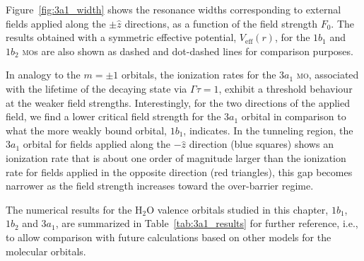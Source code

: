 Figure~\ref{fig:3a1_width} shows the resonance widths corresponding to
external fields applied along the $\pm\hat{z}$ directions, as a
function of the field strength $F_{0}$. The results obtained with a
symmetric effective potential, $V_{\mathrm{eff}}(r)$, for the $1b_{1}$
and $1b_{2}$ \textsc{mo}s are also shown as dashed and dot-dashed
lines for comparison purposes.

In analogy to the $m=\pm 1$ orbitals, the ionization rates for the
$3a_{1}$ \textsc{mo}, associated with the lifetime of the decaying
state via $\Gamma\tau=1$, exhibit a threshold behaviour at the weaker
field strengths. Interestingly, for the two directions of the applied
field, we find a lower critical field strength for the $3a_{1}$
orbital in comparison to what the more weakly bound orbital, $1b_{1}$,
indicates.  In the tunneling region, the $3a_{1}$ orbital for fields
applied along the $-\hat{z}$ direction (blue squares) shows an
ionization rate that is about one order of magnitude larger than the
ionization rate for fields applied in the opposite direction (red
triangles), this gap becomes narrower as the field strength increases
toward the over-barrier regime.

The numerical results for the H$_{2}$O valence orbitals studied in
this chapter, $1b_{1}$, $1b_{2}$ and $3a_{1}$, are summarized in
Table~\ref{tab:3a1_results} for further reference, i.e., to allow
comparison with future calculations based on other models for the
molecular orbitals.


